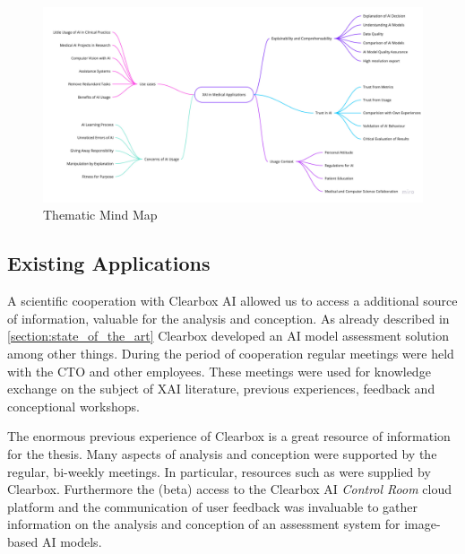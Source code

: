 \documentclass[11pt,a4paper,english]{scrreprt}
\begin{document}
\begin{figure}[htbp]
    \centering
    \includegraphics[height=0.8\textwidth, angle=90]{img/figures/Thematic_Mind_Map.pdf}
    \caption{Thematic Mind Map}
    \label{fig:thematic_mind_map}
\end{figure}

\subsection{Existing Applications}
A scientific cooperation with Clearbox AI allowed us to access a additional source of information, valuable for the analysis and conception. As already described in \autoref{section:state_of_the_art} Clearbox developed an AI model assessment solution among other things. During the period of cooperation regular meetings were held with the CTO and other employees. These meetings were used for knowledge exchange on the subject of XAI literature, previous experiences, feedback and conceptional workshops.

The enormous previous experience of Clearbox is a great resource of information for the thesis. Many aspects of analysis and conception were supported by the regular, bi-weekly meetings. In particular, resources such as \textcite{people_ai_google_website, captum_website,streamlit_website, lapuschkin_unmasking_2019} were supplied by Clearbox. Furthermore the (beta) access to the Clearbox AI \textit{Control Room} cloud platform and the communication of user feedback was invaluable to gather information on the analysis and conception of an assessment system for image-based AI models.
\end{document}
